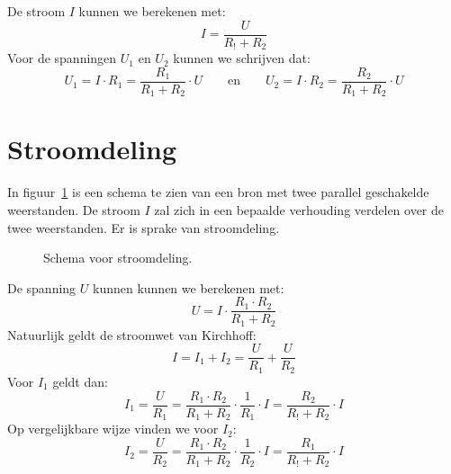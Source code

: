 De stroom $I$ kunnen we berekenen met:
%
\begin{equation}
I = \dfrac{U}{R_!+R_2}
\end{equation} 
%
Voor de spanningen $U_1$ en $U_2$ kunnen we schrijven dat:
%
\begin{equation}
U_1 = I\cdot R_1 = \dfrac{R_1}{R_1+R_2}\cdot U \qquad\text{en}\qquad U_2 = I\cdot R_2 = \dfrac{R_2}{R_1+R_2}\cdot U
\end{equation}


\section{Stroomdeling}
In figuur~\ref{fig:gelstroomdeling} is een schema te zien van een bron met twee parallel
geschakelde weerstanden. De stroom $I$ zal zich in een bepaalde verhouding
verdelen over de twee weerstanden. Er is sprake van stroomdeling.

\begin{figure}[!ht]
\centering
{}
\caption{Schema voor stroomdeling.}
\label{fig:gelstroomdeling}
\end{figure}

De spanning $U$ kunnen kunnen we berekenen met:
%
\begin{equation}
U = I\cdot\dfrac{R_1\cdot R_2}{R_1+R_2}
\end{equation}
%
Natuurlijk geldt de stroomwet van Kirchhoff:
%
\begin{equation}
I = I_1 + I_2 = \dfrac{U}{R_1} + \dfrac{U}{R_2}
\end{equation}
%
Voor $I_1$ geldt dan:
%
\begin{equation}
I_1 = \dfrac{U}{R_1} = \dfrac{R_1\cdot R_2}{R_1+R_2}\cdot \dfrac{1}{R_1}\cdot I = \dfrac{R_2}{R_!+R_2}\cdot I
\end{equation}
%
Op vergelijkbare wijze vinden we voor $I_2$:
%
\begin{equation}
I_2 = \dfrac{U}{R_2} = \dfrac{R_1\cdot R_2}{R_1+R_2}\cdot \dfrac{1}{R_2}\cdot I = \dfrac{R_1}{R_!+R_2}\cdot I
\end{equation}


